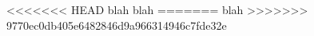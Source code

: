 \documentclass[12pt,a4paper]{article}
\begin{document}
<<<<<<< HEAD
	blah blah
=======
	blah
>>>>>>> 9770ec0db405e6482846d9a966314946c7fde32e
\end{document}
